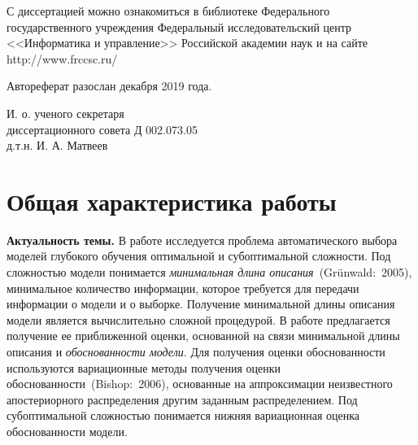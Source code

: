 \documentclass[11pt, a5paper]{dissert}
\theoremstyle{definition}
\begin{document}
{\vspace{0.2cm}
\noindent С диссертацией можно ознакомиться в библиотеке Федерального государственного учреждения Федеральный исследовательский центр <<Информатика и управление>> Российской академии наук и на сайте http://www.frccsc.ru/

\vspace{0.2cm}
\noindent Автореферат разослан  \quad \quad декабря 2019 года.

\vspace{0.3cm}
\noindent И. о. ученого секретаря\\
диссертационного совета Д 002.073.05\\
д.т.н.
\hspace{12cm} И. А. Матвеев
}

\clearpage





\section*{Общая характеристика работы}
\label{ch:Introduction}

\textbf{Актуальность темы.}
В работе исследуется проблема автоматического выбора моделей глубокого обучения оптимальной и субоптимальной сложности. 
Под сложностью модели понимается \emph{минимальная длина описания}~(Gr{\"u}nwald:~2005),  минимальное количество информации, которое требуется для передачи информации о модели и о выборке. Получение минимальной длины описания модели является вычислительно сложной процедурой. В работе предлагается получение ее приближенной оценки, основанной на связи минимальной длины описания и \emph{обоснованности модели}. Для получения оценки обоснованности используются вариационные методы получения оценки обоснованности~(Bishop:~2006), основанные на аппроксимации неизвестного апостериорного распределения другим заданным распределением. Под субоптимальной сложностью понимается нижняя вариационная оценка обоснованности модели.
\end{document}
